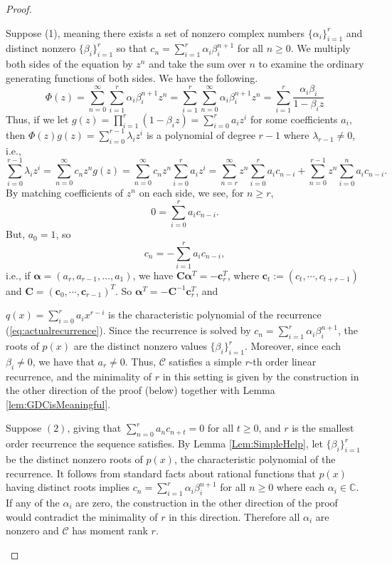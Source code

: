 \documentclass[12pt,reqno]{article}
\newcommand{\bC}{\mathbf{C}}
\begin{document}
\begin{proof}
\begin{description}
\item[$1 \Leftrightarrow 2$:] Suppose (1), meaning there exists a set of nonzero complex numbers $\{\alpha_i\}_{i=1}^r$ and distinct nonzero $\{\beta_i\}_{i=1}^r$ so that $c_n=\sum_{i=1}^r \alpha_i \beta_i^{n+1}$ for all $n\geq 0$. We multiply both sides of the equation by $z^n$ and take the sum over $n$ to examine the ordinary generating functions of both sides. We have the following. 
$$ \Phi(z) = \sum_{n=0}^\infty \sum_{i=1}^r \alpha_i \beta_i^{n+1} z^n = \sum_{i=1}^r \sum_{n=0}^\infty \alpha_i \beta_i^{n+1} z^n  = \sum_{i=1}^r  \frac{\alpha_i \beta_i}{1 - \beta_i z} 
$$ 
Thus, if we let $g(z) = \prod_{i=1}^r (1-\beta_i z) = \sum_{i=0}^r a_i z^i$ for some coefficients $a_i$, then $\Phi(z)g(z) = \sum_{i=0}^{r-1} \lambda_i z^i$ is a polynomial of degree $r-1$ where $\lambda_{r-1} \neq 0$, i.e.,
$$
\sum_{i=0}^{r-1} \lambda_i z^i = \sum_{n=0}^\infty c_n z^n g(z) = \sum_{n=0}^\infty c_n z^n \sum_{i=0}^r a_i z^i = \sum_{n=r}^\infty z^n \sum_{i=0}^r a_i c_{n-i} + \sum_{n=0}^{r-1} z^n \sum_{i=0}^n a_i c_{n-i}.
$$
By matching coefficients of $z^n$ on each side, we see, for $n \geq r$,
$$
0 = \sum_{i=0}^r a_i c_{n-i}.
$$
But, $a_0 = 1$, so
\begin{equation} \label{eq:actualrecurrence}
c_n = - \sum_{i=1}^r a_i c_{n-i},
\end{equation}
i.e., if $\boldsymbol{\alpha} = (a_r,a_{r-1},\ldots,a_1)$, we have $\bC \boldsymbol{\alpha}^T = - \mathbf{c}_r^T$,
where $\mathbf{c}_t := (c_{t}, \cdots , c_{t+r-1})$ and $\mathbf{C} = (\mathbf{c}_{0}, \cdots , \mathbf{c}_{r-1})^T$. So $\boldsymbol{\alpha}^T = - \bC^{-1} \mathbf{c}_r^T$, and

$q(x) = \sum_{i=0}^{r} a_i x^{r-i}$ is the characteristic polynomial of the recurrence (\ref{eq:actualrecurrence}).  Since the recurrence is solved by $c_n = \sum_{i=1}^r \alpha_i \beta_i^{n+1}$, the roots of $p(x)$ are the distinct nonzero values $\{\beta_i\}_{i=1}^r$. Moreover, since each $\beta_i\neq 0$, we have that $a_r\neq 0$. Thus, $\mathcal{C}$ satisfies a simple $r$-th order linear recurrence, and the minimality of $r$ in this setting is given by the construction in the other direction of the proof (below) together with Lemma \ref{lem:GDCisMeaningful}. 
\item Suppose $(2)$, giving that 
$\sum_{n=0}^r a_n c_{n+t} = 0$ for all $t\geq0$, and $r$ is the smallest order recurrence the sequence satisfies. 
By Lemma \ref{Lem:SimpleHelp}, let $\{\beta_i\}_{i=1}^r$ be the distinct nonzero roots of $p(x)$, the characteristic polynomial of the recurrence. It follows from standard facts about rational functions that $p(x)$ having distinct roots implies $c_n = \sum_{i=1}^r \alpha_i \beta_i^{n+1}$ for all $n\geq 0$ where each $\alpha_i \in \mathbb{C}$. If any of the $\alpha_i$ are zero, the construction in the other direction of the proof would contradict the minimality of $r$ in this direction. Therefore all $\alpha_i$ are nonzero and $\mathcal{C}$ has moment rank $r$.


\end{description}
\end{proof}
\end{document}
